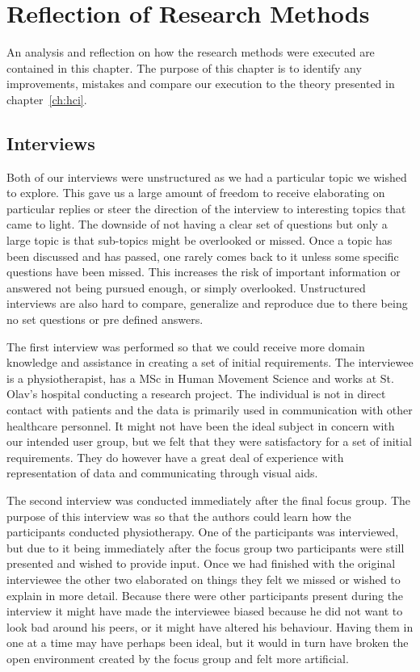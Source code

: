 \chapter{Reflection of Research Methods}
An analysis and reflection on how the research methods were executed are contained in this chapter. The purpose of this chapter is to identify any improvements, mistakes and compare our execution to the theory presented in chapter~\ref{ch:hci}.

\section{Interviews}
Both of our interviews were unstructured as we had a particular topic we wished to explore. This gave us a large amount of freedom to receive elaborating on particular replies or steer the direction of the interview to interesting topics that came to light. The downside of not having a clear set of questions but only a large topic is that sub-topics might be overlooked or missed. Once a topic has been discussed and has passed, one rarely comes back to it unless some specific questions have been missed. This increases the risk of important information or answered not being pursued enough, or simply overlooked. Unstructured interviews are also hard to compare, generalize and reproduce due to there being no set questions or pre defined answers.

The first interview was performed so that we could receive more domain knowledge and assistance in creating a set of initial requirements. The interviewee is a physiotherapist, has a MSc in Human Movement Science and works at St. Olav's hospital conducting a research project. The individual is not in direct contact with patients and the data is primarily used in communication with other healthcare personnel. It might not have been the ideal subject in concern with our intended user group, but we felt that they were satisfactory for a set of initial requirements. They do however have a great deal of experience with representation of data and communicating through visual aids.

The second interview was conducted immediately after the final focus group. The purpose of this interview was so that the authors could learn how the participants conducted physiotherapy. One of the participants was interviewed, but due to it being immediately after the focus group two participants were still presented and wished to provide input. Once we had finished with the original interviewee the other two elaborated on things they felt we missed or wished to explain in more detail. Because there were other participants present during the interview it might have made the interviewee biased because he did not want to look bad around his peers, or it might have altered his behaviour. Having them in one at a time may have perhaps been ideal, but it would in turn have broken the open environment created by the focus group and felt more artificial.


